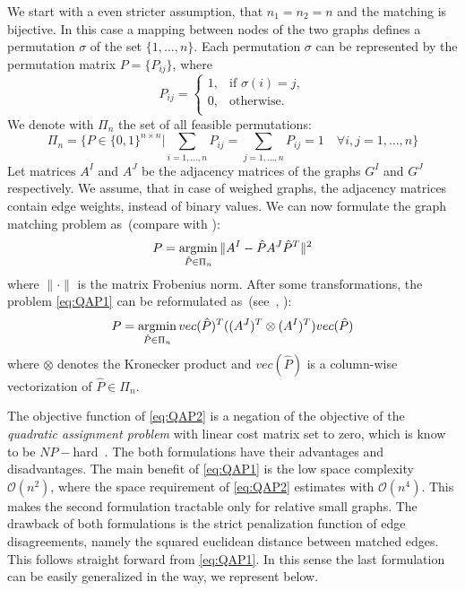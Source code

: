 We start with a even stricter assumption, that $n_1=n_2=n$ and the matching is bijective. In this case a mapping between nodes of the two graphs defines a permutation $\sigma$ of the set $\{1,\dots,n\}$. Each permutation $\sigma$ can be represented by the permutation matrix $P=\{P_{ij}\}$, where
\begin{equation*}
P_{ij}=\begin{cases}
 1, & \text{if } \sigma(i)=j, \\
 0, & \text{otherwise.} \\
\end{cases}
\end{equation*}
We denote with $\Pi_n$ the set of all feasible permutations:
\begin{equation*}
\Pi_n=\{P\in\{0,1\}^{n\times n}|\sum_{i=1,\dots,n}P_{ij}=\sum_{j=1,\dots,n}P_{ij}=1\quad\forall i,j=1,\dots,n\}
\end{equation*}
Let matrices $A^I$ and $A^J$ be the adjacency matrices of the graphs $G^I$ and $G^J$ respectively. We assume, that in case of weighed graphs, the adjacency matrices contain edge weights, instead of binary values. We can now formulate the graph matching problem as~(compare with \cite{FastPFP,Roth2001,Vogelstein_BrainGraphs}):
\begin{equation} \label{eq:QAP1}
P = \mathop{\rm argmin}_{\hat{P}\in\Pi_n}\|A^I-\hat{P}A^J\hat{P}^T\|^2
\end{equation}
where $\|\cdot\|$ is the matrix Frobenius norm. After some transformations, the problem \eqref{eq:QAP1} can be reformulated as~(see~\cite{Burkard98thequadratic}, ):
\begin{equation} \label{eq:QAP2}
P = \mathop{\rm argmin}_{\hat{P}\in\Pi_n}vec(\hat{P})^T((A^J)^T\otimes(A^I)^T)vec(\hat{P})
\end{equation}
where $\otimes$ denotes the Kronecker product and $vec(\hat{P})$ is a column-wise vectorization of $\hat{P}\in\Pi_n$.

The objective function of \eqref{eq:QAP2} is a negation of the objective of the \emph{quadratic assignment problem} with linear cost matrix set to zero, which is know to be $NP-$hard~\cite{Burkard98thequadratic,Sahni1974}. The both formulations have their advantages and disadvantages. The main benefit of \eqref{eq:QAP1} is the low space complexity $\mathcal O(n^2)$, where the space requirement of \eqref{eq:QAP2} estimates with $\mathcal O(n^4)$. This makes the second formulation tractable only for relative small graphs. The drawback of both formulations is the strict penalization function of edge disagreements, namely the squared euclidean distance between matched edges. This follows straight forward from \eqref{eq:QAP1}. In this sense the last formulation can be easily generalized in the way, we represent below. 

